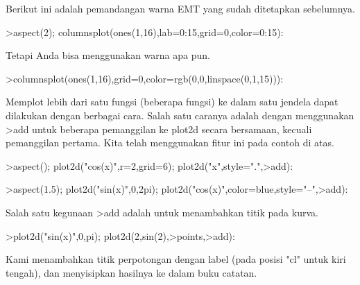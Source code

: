 \documentclass[12pt,arial,letterpaper]{book}
\begin{document}
\begin{eulernootebook}
\begin{eulercomment}
\begin{eulercomment}
\begin{eulernootebook}
\begin{eulercomment}
\begin{eulercomment}
\begin{eulercomment}
\begin{eulercomment}
\begin{eulercomment}
\begin{eulercomment}
\begin{eulercomment}
\begin{eulernotebook}
\begin{eulercomment}
\begin{eulercomment}
\begin{eulercomment}
\begin{eulercomment}
\begin{eulercomment}
Berikut ini adalah pemandangan warna EMT yang sudah ditetapkan
sebelumnya.
\end{eulercomment}
\begin{eulerprompt}
>aspect(2); columnsplot(ones(1,16),lab=0:15,grid=0,color=0:15):
\end{eulerprompt}
\begin{eulercomment}
Tetapi Anda bisa menggunakan warna apa pun.
\end{eulercomment}
\begin{eulerprompt}
>columnsplot(ones(1,16),grid=0,color=rgb(0,0,linspace(0,1,15))):
\end{eulerprompt}
\begin{eulercomment}
Memplot lebih dari satu fungsi (beberapa fungsi) ke dalam satu jendela
dapat dilakukan dengan berbagai cara. Salah satu caranya adalah dengan
menggunakan \textgreater{}add untuk beberapa pemanggilan ke plot2d secara
bersamaan, kecuali pemanggilan pertama. Kita telah menggunakan fitur
ini pada contoh di atas.
\end{eulercomment}
\begin{eulerprompt}
>aspect(); plot2d("cos(x)",r=2,grid=6); plot2d("x",style=".",>add):
\end{eulerprompt}
\begin{eulerprompt}
>aspect(1.5); plot2d("sin(x)",0,2pi); plot2d("cos(x)",color=blue,style="--",>add):
\end{eulerprompt}
\begin{eulercomment}
Salah satu kegunaan \textgreater{}add adalah untuk menambahkan titik pada kurva.
\end{eulercomment}
\begin{eulerprompt}
>plot2d("sin(x)",0,pi); plot2d(2,sin(2),>points,>add):
\end{eulerprompt}
\begin{eulercomment}
Kami menambahkan titik perpotongan dengan label (pada posisi "cl"
untuk kiri tengah), dan menyisipkan hasilnya ke dalam buku catatan.

\end{eulercomment}
\end{eulercomment}
\end{eulercomment}
\end{eulercomment}
\end{eulercomment}
\end{eulernotebook}
\end{eulercomment}
\end{eulercomment}
\end{eulercomment}
\end{eulercomment}
\end{eulercomment}
\end{eulercomment}
\end{eulercomment}
\end{eulernootebook}
\end{eulercomment}
\end{eulercomment}
\end{eulernootebook}
\end{document}
